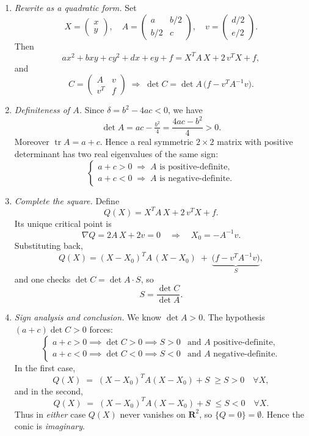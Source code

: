 \begin{enumerate}
  \item \emph{Rewrite as a quadratic form.}  
    Set
    \[
      X = \begin{pmatrix}x\\y\end{pmatrix}, 
      \quad
      A = \begin{pmatrix}a & b/2\\[3pt]b/2 & c\end{pmatrix}, 
      \quad
      v = \begin{pmatrix}d/2\\[3pt]e/2\end{pmatrix}.
    \]
    Then
    \[
      a x^2 + bxy + c y^2 + d x + e y + f
      = X^T A\,X + 2\,v^T X + f,
    \]
    and
    \[
      C = \begin{pmatrix} A & v \\[3pt] v^T & f \end{pmatrix}
      \;\Longrightarrow\;
      \det C = \det A \,\bigl(f - v^T A^{-1}v\bigr).
    \]

  \item \emph{Definiteness of \(A\).}  
    Since \(\delta = b^2 - 4ac < 0\), we have
    \[
      \det A = ac - \tfrac{b^2}{4} = \frac{4ac - b^2}{4} > 0.
    \]
    Moreover \(\operatorname{tr} A = a + c\).  Hence a real symmetric \(2\times2\) matrix with positive determinant has two real eigenvalues of the same sign:
    \[
      \begin{cases}
        a + c > 0 \;\Longrightarrow\;A\text{ is positive‐definite},\\
        a + c < 0 \;\Longrightarrow\;A\text{ is negative‐definite}.
      \end{cases}
    \]

  \item \emph{Complete the square.}  
    Define
    \[
      Q(X) = X^T A\,X + 2\,v^T X + f.
    \]
    Its unique critical point is
    \[
      \nabla Q = 2A\,X + 2v = 0
      \quad\Longrightarrow\quad
      X_0 = -A^{-1}v.
    \]
    Substituting back,
    \[
      Q(X) = (X - X_0)^T A\,(X - X_0)
      \;+\;\underbrace{\bigl(f - v^T A^{-1}v\bigr)}_{S},
    \]
    and one checks
    \(\det C = \det A\cdot S\), so
    \[
      S = \frac{\det C}{\det A}.
    \]

  \item \emph{Sign analysis and conclusion.}  
    We know \(\det A>0\).  The hypothesis \((a+c)\det C>0\) forces:
    \[
      \begin{cases}
        a+c>0 \implies \det C>0 \implies S>0
        &\text{and }A\text{ positive‐definite},\\
        a+c<0 \implies \det C<0 \implies S<0
        &\text{and }A\text{ negative‐definite}.
      \end{cases}
    \]
    In the first case,
    \[
      Q(X) \;=\;(X-X_0)^T A (X-X_0) + S\;\ge S>0
      \quad\forall X,
    \]
    and in the second,
    \[
      Q(X) \;=\;(X-X_0)^T A (X-X_0) + S\;\le S<0
      \quad\forall X.
    \]
    Thus in \emph{either} case \(Q(X)\) never vanishes on \(\mathbf R^2\), so
    \(\{Q=0\} = \emptyset\).  Hence the conic is \emph{imaginary}. 
\end{enumerate}